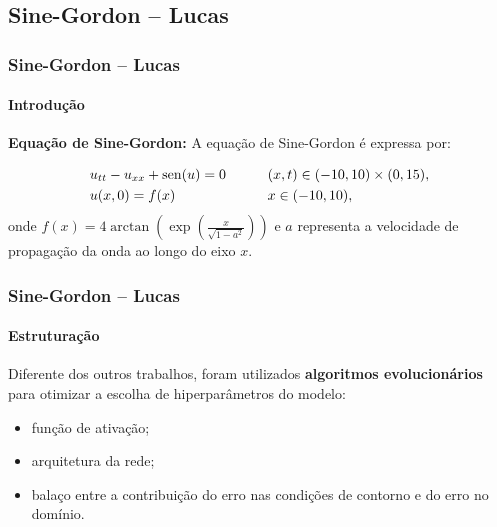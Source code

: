 \documentclass[usenames,dvipsnames,brazil,aspectratio=169]{beamer}
\begin{document}
\subsection*{Sine-Gordon -- Lucas}
\begin{frame}[t]
    \frametitle{Sine-Gordon -- Lucas}
    \framesubtitle{Introdução}

{\bf Equação de Sine-Gordon:}
A equação de Sine-Gordon é expressa por:


    \begin{alignat*}{2}
        &{u}_{tt} - {u}_{xx} + \operatorname{sen}(u) = 0 &\quad\quad& (x,t) \in (-10, 10) \times (0, 15),\\
        &{u}(x, 0) = {f}(x) &\quad\quad& x \in (-10, 10),
    \end{alignat*}
    onde $f(x) = 4 \arctan \left( \exp \left( \frac{x}{\sqrt{1 - a^2}} \right) \right)$ e $a$ representa a velocidade de propagação da onda ao longo do eixo $x$.


\end{frame}
\begin{frame}[t]
    \frametitle{Sine-Gordon -- Lucas}
    \framesubtitle{Estruturação}
Diferente dos outros trabalhos, foram utilizados \textbf{algoritmos evolucionários} para otimizar a escolha de hiperparâmetros do modelo:
    \begin{itemize}
        \item<+-> função de ativação;
        \item<+-> arquitetura da rede; 
        \item<+-> balaço entre a contribuição do erro nas condições de contorno e do erro no domínio.
    \end{itemize}
\end{frame}
\end{document}
